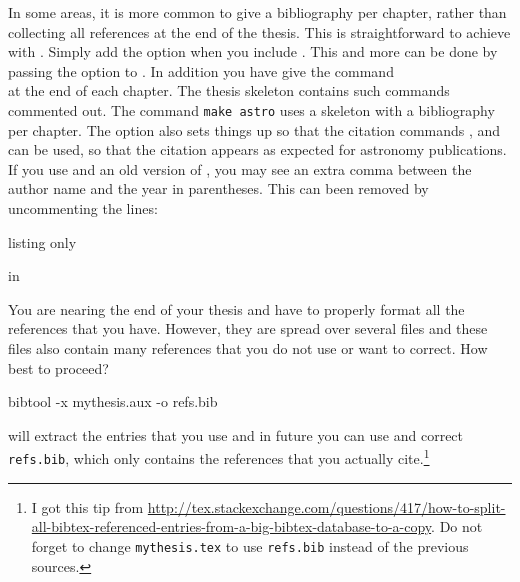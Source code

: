In some areas, it is more common to give a bibliography per chapter,
rather than collecting all references at the end of the thesis.
This is straightforward to achieve with .
Simply add the option  when you include .
This and more can be done by passing the option  to .
In addition you have give the command\\
 at the end of each chapter.
The thesis skeleton contains such commands commented out.
The command \texttt{make astro} uses a skeleton with a bibliography per chapter.
The option  also sets things up so that the  citation
commands ,  and  can be used,
so that the citation appears as expected for astronomy publications.
If you use  and an old version of ,
you may see an extra comma between the author name and the year in parentheses.
This can been removed by uncommenting the lines:
\begin{tcblisting}{listing only}
\end{tcblisting}
in 

You are nearing the end of your thesis and have to properly format all
the references that you have. However, they are spread over several
files and these files also contain many references that you do not use
or want to correct. How best to proceed?
\begin{bashlisting}
bibtool -x mythesis.aux -o refs.bib
\end{bashlisting}
will extract the entries that you use and in future you can use and
correct \texttt{refs.bib}, which only contains the references that you
actually cite.\footnote{%
I got this tip from
\url{http://tex.stackexchange.com/questions/417/how-to-split-all-bibtex-referenced-entries-from-a-big-bibtex-database-to-a-copy}.
Do not forget to change \texttt{mythesis.tex} to use
\texttt{refs.bib} instead of the previous sources.}

